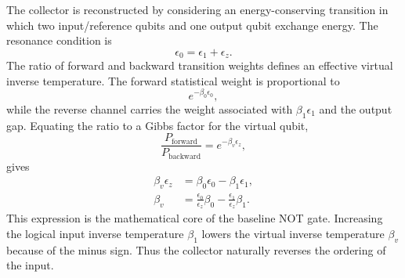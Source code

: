 \documentclass[11pt]{article}
\begin{document}
The collector is reconstructed by considering an energy-conserving transition in which two
input/reference qubits and one output qubit exchange energy.  The resonance condition is
\begin{equation}
    \epsilon_0=\epsilon_1+\epsilon_z .
\end{equation}
The ratio of forward and backward transition weights defines an effective virtual inverse
temperature.  The forward statistical weight is proportional to
\begin{equation}
    e^{-\beta_0\epsilon_0},
\end{equation}
while the reverse channel carries the weight associated with $\beta_1\epsilon_1$ and the
output gap.  Equating the ratio to a Gibbs factor for the virtual qubit,
\begin{equation}
    \frac{P_{\mathrm{forward}}}{P_{\mathrm{backward}}}
    =
    e^{-\beta_v\epsilon_z},
\end{equation}
gives
\begin{align}
    \beta_v\epsilon_z
    &=
    \beta_0\epsilon_0-\beta_1\epsilon_1,\\
    \beta_v
    &=
    \frac{\epsilon_0}{\epsilon_z}\beta_0
    -
    \frac{\epsilon_1}{\epsilon_z}\beta_1 .
\end{align}
This expression is the mathematical core of the baseline NOT gate.  Increasing the logical
input inverse temperature $\beta_1$ lowers the virtual inverse temperature $\beta_v$ because
of the minus sign.  Thus the collector naturally reverses the ordering of the input.
\end{document}
